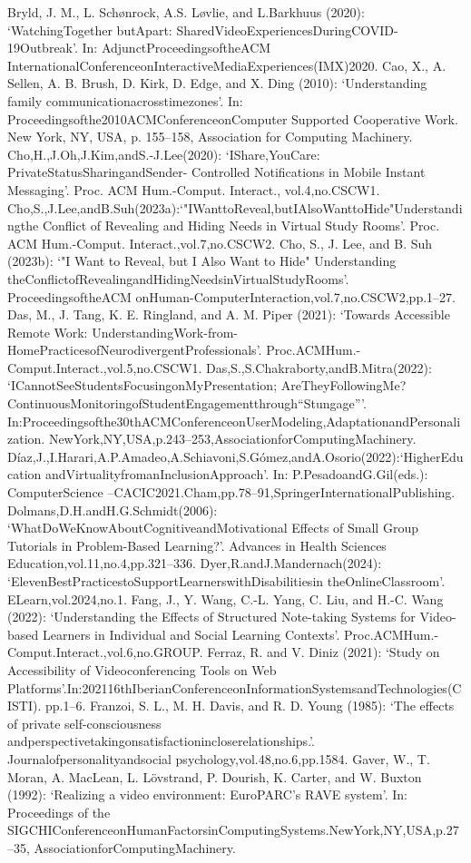 \documentclass[12pt]{ctexart}
\begin{document}
Bryld, J. M., L. Schønrock, A.S. Løvlie, and L.Barkhuus (2020): ‘WatchingTogether butApart:
SharedVideoExperiencesDuringCOVID-19Outbreak’. In: AdjunctProceedingsoftheACM
InternationalConferenceonInteractiveMediaExperiences(IMX)2020.
Cao, X., A. Sellen, A. B. Brush, D. Kirk, D. Edge, and X. Ding (2010): ‘Understanding family
communicationacrosstimezones’. In: Proceedingsofthe2010ACMConferenceonComputer
Supported Cooperative Work. New York, NY, USA, p. 155–158, Association for Computing
Machinery.
Cho,H.,J.Oh,J.Kim,andS.-J.Lee(2020): ‘IShare,YouCare: PrivateStatusSharingandSender-
Controlled Notifications in Mobile Instant Messaging’. Proc. ACM Hum.-Comput. Interact.,
vol.4,no.CSCW1.
Cho,S.,J.Lee,andB.Suh(2023a):‘"IWanttoReveal,butIAlsoWanttoHide"Understandingthe
Conflict of Revealing and Hiding Needs in Virtual Study Rooms’. Proc. ACM Hum.-Comput.
Interact.,vol.7,no.CSCW2.
Cho, S., J. Lee, and B. Suh (2023b): ‘"I Want to Reveal, but I Also Want to Hide" Understanding
theConflictofRevealingandHidingNeedsinVirtualStudyRooms’. ProceedingsoftheACM
onHuman-ComputerInteraction,vol.7,no.CSCW2,pp.1–27.
Das, M., J. Tang, K. E. Ringland, and A. M. Piper (2021): ‘Towards Accessible Remote Work:
UnderstandingWork-from-HomePracticesofNeurodivergentProfessionals’. Proc.ACMHum.-
Comput.Interact.,vol.5,no.CSCW1.
Das,S.,S.Chakraborty,andB.Mitra(2022): ‘ICannotSeeStudentsFocusingonMyPresentation;
AreTheyFollowingMe? ContinuousMonitoringofStudentEngagementthrough“Stungage”’.
In:Proceedingsofthe30thACMConferenceonUserModeling,AdaptationandPersonalization.
NewYork,NY,USA,p.243–253,AssociationforComputingMachinery.
Díaz,J.,I.Harari,A.P.Amadeo,A.Schiavoni,S.Gómez,andA.Osorio(2022):‘HigherEducation
andVirtualityfromanInclusionApproach’. In: P.PesadoandG.Gil(eds.): ComputerScience
–CACIC2021.Cham,pp.78–91,SpringerInternationalPublishing.
Dolmans,D.H.andH.G.Schmidt(2006): ‘WhatDoWeKnowAboutCognitiveandMotivational
Effects of Small Group Tutorials in Problem-Based Learning?’. Advances in Health Sciences
Education,vol.11,no.4,pp.321–336.
Dyer,R.andJ.Mandernach(2024): ‘ElevenBestPracticestoSupportLearnerswithDisabilitiesin
theOnlineClassroom’. ELearn,vol.2024,no.1.
Fang, J., Y. Wang, C.-L. Yang, C. Liu, and H.-C. Wang (2022): ‘Understanding the Effects of
Structured Note-taking Systems for Video-based Learners in Individual and Social Learning
Contexts’. Proc.ACMHum.-Comput.Interact.,vol.6,no.GROUP.
Ferraz, R. and V. Diniz (2021): ‘Study on Accessibility of Videoconferencing Tools on Web
Platforms’.In:202116thIberianConferenceonInformationSystemsandTechnologies(CISTI).
pp.1–6.
Franzoi, S. L., M. H. Davis, and R. D. Young (1985): ‘The effects of private self-consciousness
andperspectivetakingonsatisfactionincloserelationships.’. Journalofpersonalityandsocial
psychology,vol.48,no.6,pp.1584.
Gaver, W., T. Moran, A. MacLean, L. Lövstrand, P. Dourish, K. Carter, and W. Buxton (1992):
‘Realizing a video environment: EuroPARC’s RAVE system’. In: Proceedings of the
SIGCHIConferenceonHumanFactorsinComputingSystems.NewYork,NY,USA,p.27–35,
AssociationforComputingMachinery.
\end{document}
